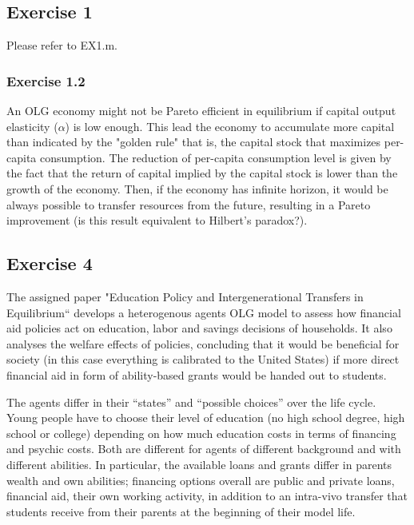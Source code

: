 \documentclass[12pt,a4paper,xcolor=dvipsnames]{article}
\begin{document}
\newpage
\subsection*{Exercise 1}
Please refer to EX1.m.

\subsubsection*{Exercise 1.2}
An OLG economy might not be Pareto efficient in equilibrium if capital output elasticity ($\alpha$) is low enough. This lead the economy to accumulate more capital than indicated by the "golden rule" that is, the capital stock that maximizes per-capita consumption. The reduction of per-capita consumption level is given by the fact that the return of capital implied by the capital stock is lower than the growth of the economy. Then, if the economy has infinite horizon, it would be always possible to transfer resources from the future, resulting in a Pareto improvement (is this result equivalent to Hilbert's paradox?).  

\subsection*{Exercise 4}
The assigned paper "Education Policy and Intergenerational Transfers in Equilibrium“ develops a heterogenous agents OLG model to assess how financial aid policies act on education, labor and savings decisions of households. It also analyses the welfare effects of policies, concluding that it would be beneficial for society (in this case everything is calibrated to the United States) if more direct financial aid in form of ability-based grants would be handed out to students. 

The agents differ in their “states” and “possible choices” over the life cycle. Young people have to choose their level of education (no high school degree, high school or college) depending on how much education costs in terms of financing and psychic costs. Both are different for agents of different background and with different abilities. In particular, the available loans and grants differ in parents wealth and own abilities; financing options overall are public and private loans, financial aid, their own working activity, in addition to an intra-vivo transfer that students receive from their parents at the beginning of their model life. 
\end{document}
